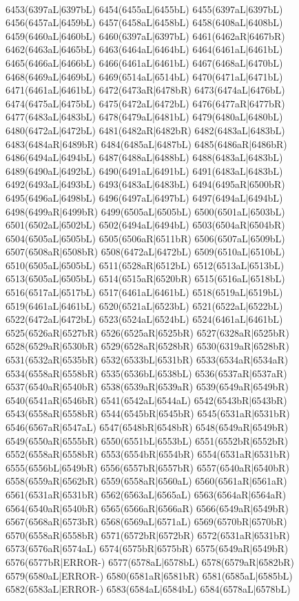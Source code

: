 \\6453(6397aL|6397bL) 6454(6455aL|6455bL) 6455(6397aL|6397bL) 6456(6457aL|6459bL) 6457(6458aL|6458bL) 6458(6408aL|6408bL) 6459(6460aL|6460bL) 6460(6397aL|6397bL) 6461(6462aR|6467bR) \\6462(6463aL|6465bL) 6463(6464aL|6464bL) 6464(6461aL|6461bL) 6465(6466aL|6466bL) 6466(6461aL|6461bL) 6467(6468aL|6470bL) 6468(6469aL|6469bL) 6469(6514aL|6514bL) 6470(6471aL|6471bL) \\6471(6461aL|6461bL) 6472(6473aR|6478bR) 6473(6474aL|6476bL) 6474(6475aL|6475bL) 6475(6472aL|6472bL) 6476(6477aR|6477bR) 6477(6483aL|6483bL) 6478(6479aL|6481bL) 6479(6480aL|6480bL) \\6480(6472aL|6472bL) 6481(6482aR|6482bR) 6482(6483aL|6483bL) 6483(6484aR|6489bR) 6484(6485aL|6487bL) 6485(6486aR|6486bR) 6486(6494aL|6494bL) 6487(6488aL|6488bL) 6488(6483aL|6483bL) \\6489(6490aL|6492bL) 6490(6491aL|6491bL) 6491(6483aL|6483bL) 6492(6493aL|6493bL) 6493(6483aL|6483bL) 6494(6495aR|6500bR) 6495(6496aL|6498bL) 6496(6497aL|6497bL) 6497(6494aL|6494bL) \\6498(6499aR|6499bR) 6499(6505aL|6505bL) 6500(6501aL|6503bL) 6501(6502aL|6502bL) 6502(6494aL|6494bL) 6503(6504aR|6504bR) 6504(6505aL|6505bL) 6505(6506aR|6511bR) 6506(6507aL|6509bL) \\6507(6508aR|6508bR) 6508(6472aL|6472bL) 6509(6510aL|6510bL) 6510(6505aL|6505bL) 6511(6528aR|6512bL) 6512(6513aL|6513bL) 6513(6505aL|6505bL) 6514(6515aR|6520bR) 6515(6516aL|6518bL) \\6516(6517aL|6517bL) 6517(6461aL|6461bL) 6518(6519aL|6519bL) 6519(6461aL|6461bL) 6520(6521aL|6523bL) 6521(6522aL|6522bL) 6522(6472aL|6472bL) 6523(6524aL|6524bL) 6524(6461aL|6461bL) \\6525(6526aR|6527bR) 6526(6525aR|6525bR) 6527(6328aR|6525bR) 6528(6529aR|6530bR) 6529(6528aR|6528bR) 6530(6319aR|6528bR) 6531(6532aR|6535bR) 6532(6533bL|6531bR) 6533(6534aR|6534aR) \\6534(6558aR|6558bR) 6535(6536bL|6538bL) 6536(6537aR|6537aR) 6537(6540aR|6540bR) 6538(6539aR|6539aR) 6539(6549aR|6549bR) 6540(6541aR|6546bR) 6541(6542aL|6544aL) 6542(6543bR|6543bR) \\6543(6558aR|6558bR) 6544(6545bR|6545bR) 6545(6531aR|6531bR) 6546(6567aR|6547aL) 6547(6548bR|6548bR) 6548(6549aR|6549bR) 6549(6550aR|6555bR) 6550(6551bL|6553bL) 6551(6552bR|6552bR) \\6552(6558aR|6558bR) 6553(6554bR|6554bR) 6554(6531aR|6531bR) 6555(6556bL|6549bR) 6556(6557bR|6557bR) 6557(6540aR|6540bR) 6558(6559aR|6562bR) 6559(6558aR|6560aL) 6560(6561aR|6561aR) \\6561(6531aR|6531bR) 6562(6563aL|6565aL) 6563(6564aR|6564aR) 6564(6540aR|6540bR) 6565(6566aR|6566aR) 6566(6549aR|6549bR) 6567(6568aR|6573bR) 6568(6569aL|6571aL) 6569(6570bR|6570bR) \\6570(6558aR|6558bR) 6571(6572bR|6572bR) 6572(6531aR|6531bR) 6573(6576aR|6574aL) 6574(6575bR|6575bR) 6575(6549aR|6549bR) 6576(6577bR|ERROR-) 6577(6578aL|6578bL) 6578(6579aR|6582bR) \\6579(6580aL|ERROR-) 6580(6581aR|6581bR) 6581(6585aL|6585bL) 6582(6583aL|ERROR-) 6583(6584aL|6584bL) 6584(6578aL|6578bL) 
